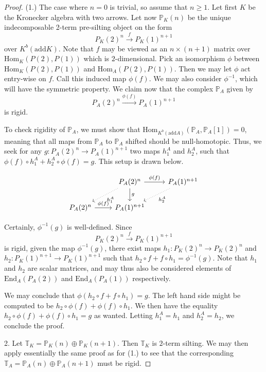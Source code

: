 \documentclass[]{article}
\theoremstyle{definition}
\begin{document}
\begin{proof}
	(1.) The case where $n = 0$ is trivial, so assume that $n \geq 1$. Let first $K$ be the Kronecker algebra with two arrows. Let now $\mathbb{P}_K(n) $ be the unique indecomposable 2-term pre-silting object on the form \[P_K(2)^n \xrightarrow{f} P_K(1)^{n+1}\] over $K^b(\text{add} K)$. Note that $f$ may be viewed as an $n\times(n+1)$ matrix over $\text{Hom}_K(P(2),P(1))$ which is $2$-dimensional. Pick an isomorphism $\phi$ between $\text{Hom}_K(P(2),P(1))$ and $\text{Hom}_A(P(2),P(1))$. Then we may let $\phi$ act entry-wise on $f$. Call this induced map $\phi(f)$. We may also consider $\phi^{-1}$, which will have the symmetric property. We claim now that the complex $\mathbb{P}_A$ given by  \[P_A(2)^n \xrightarrow{\phi(f)} P_A(1)^{n+1}\] is rigid.
	

	To check rigidity of $\mathbb{P}_A$, we must show that $\text{Hom}_{K^b(\text{add} A)}(\mathbb{P}_A,\mathbb{P}_A[1]) = 0$, meaning that all maps from $\mathbb{P}_A$ to $\mathbb{P}_A$ shifted should be null-homotopic. Thus, we seek for any $g:P_A(2)^n \to P_A(1)^{n+1}$ two maps $h^A_1$ and $h^A_2$, such that $\phi(f)\circ h^A_1 + h^A_2 \circ \phi(f) = g$. This setup is drawn below.
	
		\[\begin{tikzcd}
		& P_A(2)^n & P_A(1)^{n+1} \\
		P_A(2)^n & P_A(1)^{n+1}
		\arrow[from=1-2, to=1-3,"\phi(f)"]
		\arrow[from=2-1, to=2-2,"\phi(f)"]
		\arrow[from=1-2, to=2-2,"g"]
		\arrow["h^A_1",from=1-2, to=2-1,dotted]
		\arrow[from=1-3, to=2-2,"h^A_2",dotted]
	\end{tikzcd}\]
	
	
	 Certainly, $\phi^{-1}(g)$ is well-defined. Since \[P_K(2)^n \xrightarrow{f} P_K(1)^{n+1}\] is rigid, given the map $\phi^{-1}(g)$, there exist maps $h_1:P_K(2)^n \to P_K(2)^n$ and $h_2:P_K(1)^{n+1} \to P_K(1)^{n+1}$ such that $h_2\circ f + f \circ h_1 = \phi^{-1}(g)$. Note that $h_1$ and $h_2$ are scalar matrices, and may thus also be considered elements of $\text{End}_A(P_A(2))$ and $\text{End}_A(P_A(1))$ respectively.
	
	We may conclude that $\phi(h_2\circ f + f \circ h_1) = g$. The left hand side might be computed to be $h_2 \circ \phi(f) + \phi(f) \circ h_1$. We then have the equality $h_2 \circ \phi(f) + \phi(f) \circ h_1 = g$ as wanted. Letting $h^A_1 = h_1$ and $h^A_2 = h_2$, we conclude the proof.
	
	2. Let $\mathbb{T}_K = \mathbb{P}_K(n) \oplus \mathbb{P}_K(n+1)$. Then $\mathbb{T}_K$ is $2$-term silting. We may then apply essentially the same proof as for (1.) to see that the corresponding $\mathbb{T}_A = \mathbb{P}_A(n) \oplus \mathbb{P}_A(n+1)$ must be rigid.
	
\end{proof}
\end{document}
